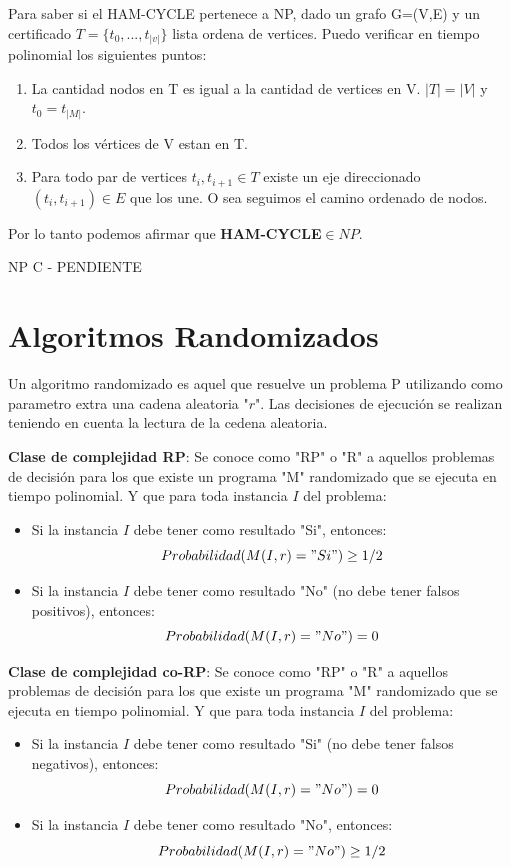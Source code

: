 \documentclass{article}
\begin{document}
Para saber si el HAM-CYCLE pertenece a NP, dado un grafo G=(V,E) 
y un certificado \(T = \{t_0,...,t_{|v|}\}\) lista ordena de vertices.
Puedo verificar en tiempo polinomial los siguientes puntos:

\begin{enumerate}
    \item La cantidad nodos en T es igual a la cantidad de vertices en V. \(|T|=|V|\) y \(t_0=t_|M|\).
    \item Todos los vértices de V estan en T.
    \item Para todo par de vertices \(t_i, t_{i+1} \in T\) existe un eje direccionado \((t_i, t_{i+1}) \in E\) que los une. 
    O sea seguimos el camino ordenado de nodos.
\end{enumerate}

Por lo tanto podemos afirmar que \textbf{HAM-CYCLE}\(\in NP\).

NP C - PENDIENTE

\section{Algoritmos Randomizados}

Un algoritmo randomizado es aquel que resuelve un problema P utilizando 
como parametro extra una cadena aleatoria "\(r\)". Las decisiones de ejecución
se realizan teniendo en cuenta la lectura de la cedena aleatoria.

\textbf{Clase de complejidad RP}: Se conoce como "RP" o "R" a aquellos problemas de decisión
para los que existe un programa "M" randomizado que se ejecuta en tiempo polinomial. Y que para 
toda instancia \(I\) del problema:
\begin{itemize}
    \item Si la instancia \(I\) debe tener como resultado "Si", entonces:
     \[
         Probabilidad(M(I,r)="Si")\geq 1/2
     \] 
    \item Si la instancia \(I\) debe tener como resultado "No" (no debe tener falsos positivos), entonces:
    \[
        Probabilidad(M(I,r)="No") = 0
    \] 
    
\end{itemize}

\textbf{Clase de complejidad co-RP}: Se conoce como "RP" o "R" a aquellos problemas de decisión
para los que existe un programa "M" randomizado que se ejecuta en tiempo polinomial. Y que para 
toda instancia \(I\) del problema:
\begin{itemize}
    \item Si la instancia \(I\) debe tener como resultado "Si" (no debe tener falsos negativos), entonces:
     \[
         Probabilidad(M(I,r)="No") = 0
     \] 
    \item Si la instancia \(I\) debe tener como resultado "No", entonces:
    \[
        Probabilidad(M(I,r)="No") \geq 1/2
    \]
\end{itemize}
\end{document}
